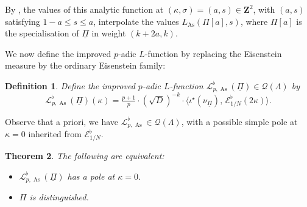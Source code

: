 \documentclass[a4paper,10pt]{amsart}
\theoremstyle{plain}
\newtheorem{theorem}{Theorem}[section]
\newtheorem{definition}[theorem]{Definition}
\theoremstyle{remark}
\DeclareMathOperator{\As}{As}
\newcommand{\ZZ}{\mathbf{Z}}
\newcommand{\cE}{\mathcal{E}}
\newcommand{\cL}{\mathcal{L}}
\newcommand{\uPi}{\underline{\Pi}}
\numberwithin{equation}{section}
\renewcommand{\le}{\leqslant}
\begin{document}
  \begin{remark}
   By \cite[Theorem C]{grossiloefflerzerbesLfunct}, the values of this analytic function at $(\kappa, \sigma) = (a, s) \in \ZZ^2$, with $(a, s)$ satisfying $1 - a \le s \le a$, interpolate the values $L_{\As}(\Pi[a], s)$, where $\Pi[a]$ is the specialisation of $\uPi$ in weight $(k + 2a, k)$.
  \end{remark}

  We now define the improved $p$-adic $L$-function by replacing the Eisenstein measure by the ordinary Eisenstein family:

  \begin{definition}
   Define the improved $p$-adic $L$-function $\cL^\flat_{p,\As}(\uPi) \in \mathcal{Q}(\Lambda)$ by
   \[
    \cL^\flat_{p,\As}(\uPi)(\kappa) =
     \tfrac{p + 1}{p} \cdot (\sqrt{D})^{-k} \cdot \Big\langle
     \iota^\star\left(\nu_{\underline{\Pi}}\right),\,
     \cE^{\flat}_{1/N}(2\kappa)
    \Big\rangle.
   \]
  \end{definition}

 \begin{note}
  Observe that a priori, we have $\cL^\flat_{p,\As} \in \mathcal{Q}(\Lambda)$, with a possible simple pole at $\kappa = 0$ inherited from $\cE^{\flat}_{1/N}$.
 \end{note}

 \begin{theorem}
  \label{thm:nopole}
  The following are equivalent:
  \begin{itemize}
   \item $\cL^\flat_{p,\As}(\uPi)$ has a pole at $\kappa = 0$.
   \item $\Pi$ is distinguished.
  \end{itemize}
 \end{theorem}
 
\end{document}
